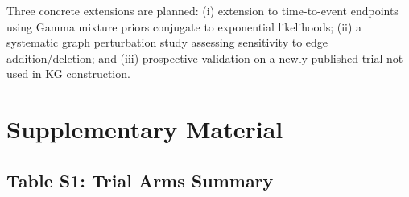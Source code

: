 \documentclass[12pt]{article}
\begin{document}
Three concrete extensions are planned: (i) extension to time-to-event endpoints using Gamma mixture priors conjugate to exponential likelihoods; (ii) a systematic graph perturbation study assessing sensitivity to edge addition/deletion; and (iii) prospective validation on a newly published trial not used in KG construction.

\appendix
\section*{Supplementary Material}

\subsection*{Table S1: Trial Arms Summary}
\end{document}
